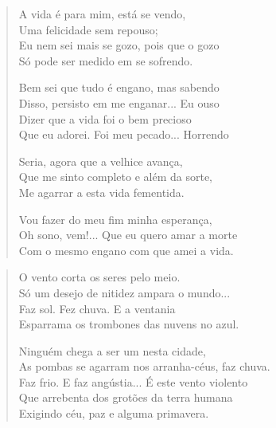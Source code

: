 
\begin{verse}
A vida é para mim, está se vendo,\\
Uma felicidade sem repouso;\\
Eu nem sei mais se gozo, pois que o gozo\\
Só pode ser medido em se sofrendo.

Bem sei que tudo é engano, mas sabendo\\
Disso, persisto em me enganar... Eu ouso\\
Dizer que a vida foi o bem precioso\\
Que eu adorei. Foi meu pecado... Horrendo

Seria, agora que a velhice avança,\\
Que me sinto completo e além da sorte,\\
Me agarrar a esta vida fementida.

Vou fazer do meu fim minha esperança,\\
Oh sono, vem!... Que eu quero amar a morte\\
Com o mesmo engano com que amei a vida.
\end{verse}


\begin{verse}
O vento corta os seres pelo meio.\\
Só um desejo de nitidez ampara o mundo...\\
Faz sol. Fez chuva. E a ventania\\
Esparrama os trombones das nuvens no azul.

Ninguém chega a ser um nesta cidade,\\
As pombas se agarram nos arranha-céus, faz chuva.\\
Faz frio. E faz angústia... É este vento violento\\
Que arrebenta dos grotões da terra humana\\
Exigindo céu, paz e alguma primavera.
\end{verse}


